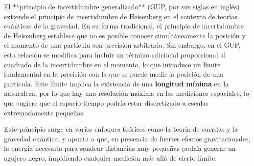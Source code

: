 El **principio de incertidumbre generalizado** (GUP, por sus siglas en inglés) extiende el principio de incertidumbre de Heisenberg en el contexto de teorías cuánticas de la gravedad. En su forma tradicional, el principio de incertidumbre de Heisenberg establece que no es posible conocer simultáneamente la posición y el momento de una partícula con precisión arbitraria. Sin embargo, en el GUP, esta relación se modifica para incluir un término adicional proporcional al cuadrado de la incertidumbre en el momento, lo que introduce un límite fundamental en la precisión con la que se puede medir la posición de una partícula. Este límite implica la existencia de una \textbf{longitud mínima} en la naturaleza, por lo que hay una resolución máxima en las mediciones espaciales, lo que sugiere que el espacio-tiempo podría estar discretizado a escalas extremadamente pequeñas.

Este principio surge en varios enfoques teóricos como la teoría de cuerdas y la gravedad cuántica, y apunta a que, en presencia de fuertes efectos gravitacionales, la energía necesaria para sondear distancias muy pequeñas podría generar un agujero negro, impidiendo cualquier medición más allá de cierto límite.

